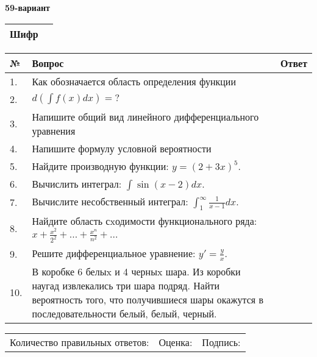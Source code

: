 \documentclass{article}
\begin{document}
  \egroup
  
  \newpage
  
  
  \textbf{59-вариант}\\
  
  \bgroup
  \def\arraystretch{1.6} %
  
  \begin{tabular}{|m{5.7cm}|m{9.5cm}|}
  \hline
  Шифр & \\
  \hline
  \end{tabular}
  
  \vspace{1cm}
  
  \begin{tabular}{|m{0.7cm}|m{10cm}|m{4cm}|}
  \hline
  № & Вопрос & Ответ \\
  \hline
  1. & Как обозначается область определения функции &  \\
  \hline
  2. & \(d\left( \int{f(x)dx} \right) = ?\) &  \\
  \hline
  3. & Напишите общий вид линейного дифференциального уравнения &  \\
  \hline
  4. & Напишите формулу условной вероятности &  \\
  \hline
  5. & Найдите производную функции: \(y = (2 + 3x)^{5}\). &  \\
  \hline
  6. & Вычислить интеграл: \(\int{\sin(x - 2)dx}\). &  \\
  \hline
  7. & Вычислите несобственный интеграл: \(\int_{1}^{\infty}{\frac{1}{x - 1}dx}\). &  \\
  \hline
  8. & Найдите область сxодимости функционального ряда: \(x + \frac{x^{2}}{2^{2}} + ... + \frac{x^{n}}{n^{2}} + ...\) &  \\
  \hline
  9. & Решите дифференциальное уравнение: \(y' = \frac{y}{x}\). &  \\
  \hline
  10. & В коробке 6 белыx и 4 черныx шара. Из коробки наугад извлекались три шара подряд. Найти вероятность того, что получившиеся шары окажутся в последовательности белый, белый, черный. &  \\
  \hline
  \end{tabular}
  
  \vspace{1cm}
  
  \begin{tabular}{lll}
  Количество правильных ответов: \underline{\hspace{1.5cm}} & 
  Оценка: \underline{\hspace{1.5cm}} & 
  Подпись: \underline{\hspace{2cm}} \\
  \end{tabular}
  
\end{document}
